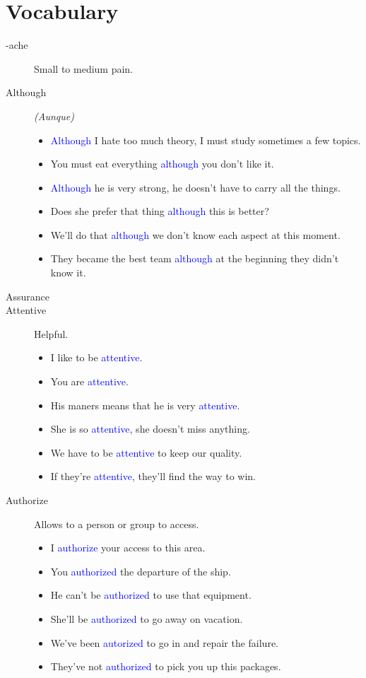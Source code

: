 \section{Vocabulary}
\begin{multicols}{2}
\begin{description}

\item[-ache] Small to medium pain.

\item[Although] \emph{(Aunque)}
\begin{itemize}
\item \textcolor{blue}{Although} I hate too much theory, I must study sometimes a few topics.
\item You must eat everything \textcolor{blue}{although} you don't like it.
\item \textcolor{blue}{Although} he is very strong, he doesn't have to carry all the things.
\item Does she prefer that thing \textcolor{blue}{although} this is better?
\item We'll do that \textcolor{blue}{although} we don't know each aspect at this moment.
\item They became the best team \textcolor{blue}{although} at the beginning they didn't know it.
\end{itemize}

\item[Assurance]

\item[Attentive] Helpful.
\begin{itemize}
\item I like to be \textcolor{blue}{attentive}.
\item You are \textcolor{blue}{attentive}.
\item His maners means that he is very \textcolor{blue}{attentive}.
\item She is so \textcolor{blue}{attentive}, she doesn't miss anything.
\item We have to be \textcolor{blue}{attentive} to keep our quality.
\item If they're \textcolor{blue}{attentive}, they'll find the way to win.
\end{itemize}

\item[Authorize] Allows to a person or group to access.
\begin{itemize}
\item I \textcolor{blue}{authorize} your access to this area.
\item You \textcolor{blue}{authorized} the departure of the ship.
\item He can't be \textcolor{blue}{authorized} to use that equipment.
\item She'll be \textcolor{blue}{authorized} to go away on vacation.
\item We've been \textcolor{blue}{autorized} to go in and repair the failure.
\item They've not \textcolor{blue}{authorized} to pick you up this packages.
\end{itemize}


\end{description}
\end{multicols}
